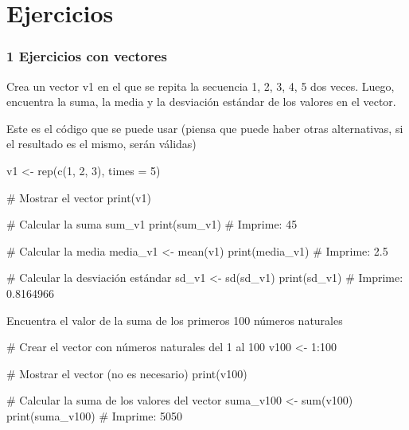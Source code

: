 \documentclass[
  letterpaper,
]{scrbook}
\newenvironment{Shaded}{\begin{snugshade}}{\end{snugshade}}
\newcommand{\AttributeTok}[1]{\textcolor[rgb]{0.40,0.45,0.13}{#1}}
\newcommand{\CommentTok}[1]{\textcolor[rgb]{0.37,0.37,0.37}{#1}}
\newcommand{\DecValTok}[1]{\textcolor[rgb]{0.68,0.00,0.00}{#1}}
\newcommand{\FunctionTok}[1]{\textcolor[rgb]{0.28,0.35,0.67}{#1}}
\newcommand{\NormalTok}[1]{\textcolor[rgb]{0.00,0.23,0.31}{#1}}
\newcommand{\OtherTok}[1]{\textcolor[rgb]{0.00,0.23,0.31}{#1}}
\newcommand{\SpecialCharTok}[1]{\textcolor[rgb]{0.37,0.37,0.37}{#1}}
\begin{document}
\hypertarget{section}{%
\section{}\label{section}}

\hypertarget{ejercicios-1}{%
\chapter{Ejercicios}\label{ejercicios-1}}

\hypertarget{ejercicios-con-vectores-1}{%
\subsection{1 Ejercicios con vectores}\label{ejercicios-con-vectores-1}}

Crea un vector v1 en el que se repita la secuencia 1, 2, 3, 4, 5 dos
veces. Luego, encuentra la suma, la media y la desviación estándar de
los valores en el vector.

Este es el código que se puede usar (piensa que puede haber otras
alternativas, si el resultado es el mismo, serán válidas)

\begin{Shaded}
\begin{Highlighting}[]
\NormalTok{v1 }\OtherTok{\textless{}{-}} \FunctionTok{rep}\NormalTok{(}\FunctionTok{c}\NormalTok{(}\DecValTok{1}\NormalTok{, }\DecValTok{2}\NormalTok{, }\DecValTok{3}\NormalTok{), }\AttributeTok{times =} \DecValTok{5}\NormalTok{)}

\CommentTok{\# Mostrar el vector}
\FunctionTok{print}\NormalTok{(v1)}


\CommentTok{\# Calcular la suma}
\NormalTok{sum\_v1}
\FunctionTok{print}\NormalTok{(sum\_v1)}
\CommentTok{\# Imprime: 45}

\CommentTok{\# Calcular la media}
\NormalTok{media\_v1 }\OtherTok{\textless{}{-}} \FunctionTok{mean}\NormalTok{(v1)}
\FunctionTok{print}\NormalTok{(media\_v1)}
\CommentTok{\# Imprime: 2.5}

\CommentTok{\# Calcular la desviación estándar}
\NormalTok{sd\_v1 }\OtherTok{\textless{}{-}} \FunctionTok{sd}\NormalTok{(sd\_v1)}
\FunctionTok{print}\NormalTok{(sd\_v1)}
\CommentTok{\# Imprime: 0.8164966}
\end{Highlighting}
\end{Shaded}

Encuentra el valor de la suma de los primeros 100 números naturales

\begin{Shaded}
\begin{Highlighting}[]
\CommentTok{\# Crear el vector con números naturales del 1 al 100}
\NormalTok{v100 }\OtherTok{\textless{}{-}} \DecValTok{1}\SpecialCharTok{:}\DecValTok{100}

\CommentTok{\# Mostrar el vector (no es necesario)}
\FunctionTok{print}\NormalTok{(v100)}

\CommentTok{\# Calcular la suma de los valores del vector}
\NormalTok{suma\_v100 }\OtherTok{\textless{}{-}} \FunctionTok{sum}\NormalTok{(v100)}
\FunctionTok{print}\NormalTok{(suma\_v100)}
\CommentTok{\# Imprime: 5050}
\end{Highlighting}
\end{Shaded}
\end{document}
